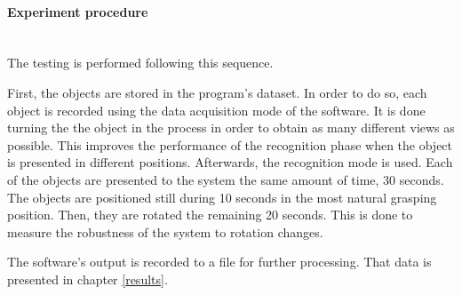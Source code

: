 \begin{itemize}


	\paragraph{Experiment procedure}\mbox{}\\

		The testing is performed following this sequence. 



		First, the objects are stored in the program's dataset. 
		In order to do so, each object is recorded using the data acquisition mode of the software. 
		It is done turning the the object in the process in order to obtain as many different views as possible. 
		This improves the performance of the recognition phase when the object is presented in different positions. 
		Afterwards, the recognition mode is used.
		Each of the objects are presented to the system the same amount of time, 30 seconds. 
		The objects are positioned still during 10 seconds in the most natural grasping position. 
		Then, they are rotated the remaining 20 seconds. 
		This is done to measure the robustness of the system to rotation changes. 

		The software's output is recorded to a file for further processing. 
		That data is presented in chapter \ref{results}.
		\\


\end{itemize}
